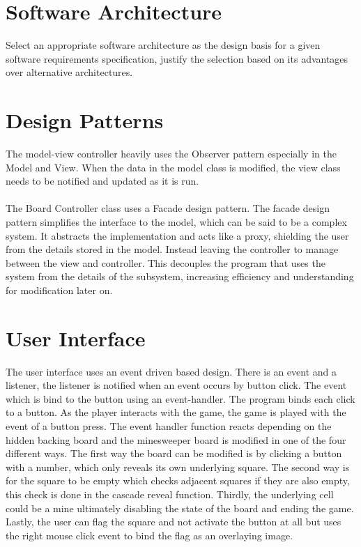 \documentclass[12pt, a4]{report}
\begin{document}
	\section{Software Architecture}
	Select an appropriate software architecture as the design basis for a given software requirements specification, justify the selection based on its advantages over alternative architectures.
	\newpage
	\section{Design Patterns}
	\par The model-view controller heavily uses the Observer pattern especially in the Model and View. When the data in the model class is modified, the view class needs to be notified and updated as it is run. \\
	\\
	The Board Controller class uses a Facade design pattern. The facade design pattern simplifies the interface to the model, which can be said to be a complex system. It abstracts the implementation and acts like a proxy, shielding the user from the details stored in the model. Instead leaving the controller to manage between the view and controller. This decouples the program that uses the system from the details of the subsystem, increasing efficiency and understanding for modification later on. 

	\section{User Interface}
	The user interface uses an event driven based design. There is an event and a listener, the listener is notified when an event occurs by button click. The event which is bind to the button using an event-handler. The program binds each click to a button. As the player interacts with the game, the game is played with the event of a button press. The event handler function reacts depending on the hidden backing board and the minesweeper board is modified in one of the four different ways. The first way the board can be modified is by clicking a button with a number, which only reveals its own underlying square. The second way is for the square to be empty which checks adjacent squares if they are also empty, this check is done in the cascade reveal function. Thirdly, the underlying cell could be a mine ultimately disabling the state of the board and ending the game. Lastly, the user can flag the square and not activate the button at all but uses the right mouse click event to bind the flag as an overlaying image. 
\end{document}
